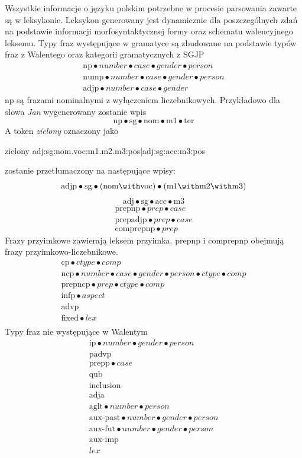 \documentclass[oneside,pwrcover,withmarginpar,hidelinks,11pt]{article}
\newcommand{\tensor}{\bullet}
\begin{document}
Wszystkie informacje o języku polskim potrzebne w procesie parsowania zawarte są w leksykonie.
Leksykon generowany jest dynamicznie dla poszczególnych zdań na podstawie
informacji morfosyntaktycznej formy oraz schematu walencyjnego leksemu.
Typy fraz występujące w gramatyce są zbudowane na podstawie typów fraz z Walentego oraz kategorii gramatycznych z SGJP
\[\begin{array}{l}
\text{np}\tensor number\tensor case\tensor gender\tensor person\\
\text{nump}\tensor number\tensor case\tensor gender\tensor person\\
\text{adjp}\tensor number\tensor case\tensor gender
\end{array}\]
np są frazami nominalnymi z wyłączeniem liczebnikowych.
Przykładowo dla słowa {\it Jan} wygenerowany zostanie wpis
\[\text{np}\tensor\text{sg}\tensor\text{nom}\tensor\text{m1}\tensor\text{ter}\]
A token {\it zielony} oznaczony jako
\begin{center}
zielony adj:sg:nom.voc:m1.m2.m3:pos|adj:sg:acc:m3:pos
\end{center}
zostanie przetłumaczony na następujące wpisy:
\[\text{adjp}\tensor\text{sg}\tensor(\text{nom}\with\text{voc})\tensor(\text{m1}\with\text{m2}\with\text{m3})\]
\[\text{adj}\tensor\text{sg}\tensor\text{acc}\tensor\text{m3}\]
\[\begin{array}{l}
\text{prepnp}\tensor prep\tensor case\\
\text{prepadjp}\tensor prep\tensor case\\
\text{comprepnp}\tensor prep
\end{array}\]
Frazy przyimkowe zawierają leksem przyimka.
prepnp i comprepnp obejmują frazy przyimkowo-liczebnikowe.
\[\begin{array}{l}
\text{cp}\tensor ctype\tensor comp\\
\text{ncp}\tensor number\tensor case\tensor gender\tensor person\tensor ctype\tensor comp\\
\text{prepncp}\tensor prep\tensor ctype\tensor comp\\
\text{infp}\tensor aspect\\
\text{advp}\\
\text{fixed}\tensor lex\\
\end{array}\]
Typy fraz nie występujące w Walentym
\[\begin{array}{l}
\text{ip}\tensor number\tensor gender\tensor person\\
\text{padvp}\\
\text{prepp}\tensor case\\
\text{qub}\\
\text{inclusion}\\
\text{adja}\\
\text{aglt}\tensor number\tensor person\\
\text{aux-past}\tensor number\tensor gender\tensor person\\
\text{aux-fut}\tensor number\tensor gender\tensor person\\
\text{aux-imp}\\
lex
\end{array}\]
\end{document}
